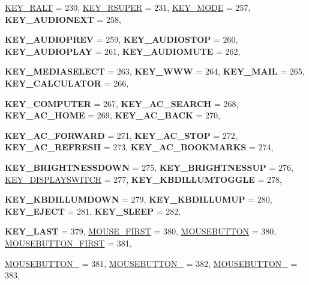 \begin{DoxyCompactItemize}
\par
\hyperlink{classphys_1_1MetaCode_a3e501cbb5bf0f6f1fdb7211465bda8d8aee151fcf77cce58411d19d9cb679875e}{KEY\_\-RALT} =  230, 
\hyperlink{classphys_1_1MetaCode_a3e501cbb5bf0f6f1fdb7211465bda8d8a84e2235ece031f83821867486ff52149}{KEY\_\-RSUPER} =  231, 
\hyperlink{classphys_1_1MetaCode_a3e501cbb5bf0f6f1fdb7211465bda8d8a9e26ea2006e876ccaa80fe4ae441da46}{KEY\_\-MODE} =  257, 
{\bfseries KEY\_\-AUDIONEXT} =  258, 
\par
{\bfseries KEY\_\-AUDIOPREV} =  259, 
{\bfseries KEY\_\-AUDIOSTOP} =  260, 
{\bfseries KEY\_\-AUDIOPLAY} =  261, 
{\bfseries KEY\_\-AUDIOMUTE} =  262, 
\par
{\bfseries KEY\_\-MEDIASELECT} =  263, 
{\bfseries KEY\_\-WWW} =  264, 
{\bfseries KEY\_\-MAIL} =  265, 
{\bfseries KEY\_\-CALCULATOR} =  266, 
\par
{\bfseries KEY\_\-COMPUTER} =  267, 
{\bfseries KEY\_\-AC\_\-SEARCH} =  268, 
{\bfseries KEY\_\-AC\_\-HOME} =  269, 
{\bfseries KEY\_\-AC\_\-BACK} =  270, 
\par
{\bfseries KEY\_\-AC\_\-FORWARD} =  271, 
{\bfseries KEY\_\-AC\_\-STOP} =  272, 
{\bfseries KEY\_\-AC\_\-REFRESH} =  273, 
{\bfseries KEY\_\-AC\_\-BOOKMARKS} =  274, 
\par
{\bfseries KEY\_\-BRIGHTNESSDOWN} =  275, 
{\bfseries KEY\_\-BRIGHTNESSUP} =  276, 
\hyperlink{classphys_1_1MetaCode_a3e501cbb5bf0f6f1fdb7211465bda8d8aadc4c974c86930fa73a693b7db4f7755}{KEY\_\-DISPLAYSWITCH} =  277, 
{\bfseries KEY\_\-KBDILLUMTOGGLE} =  278, 
\par
{\bfseries KEY\_\-KBDILLUMDOWN} =  279, 
{\bfseries KEY\_\-KBDILLUMUP} =  280, 
{\bfseries KEY\_\-EJECT} =  281, 
{\bfseries KEY\_\-SLEEP} =  282, 
\par
{\bfseries KEY\_\-LAST} =  379, 
\hyperlink{classphys_1_1MetaCode_a3e501cbb5bf0f6f1fdb7211465bda8d8a1bb7f008c7d430e886141a3b8b697129}{MOUSE\_\-FIRST} =  380, 
\hyperlink{classphys_1_1MetaCode_a3e501cbb5bf0f6f1fdb7211465bda8d8a9cc80a2db206fb540fbb92a8ff64268a}{MOUSEBUTTON} =  380, 
\hyperlink{classphys_1_1MetaCode_a3e501cbb5bf0f6f1fdb7211465bda8d8a92ee5571be5e198a62eda83f27b27ab8}{MOUSEBUTTON\_\-FIRST} =  381, 
\par
\hyperlink{classphys_1_1MetaCode_a3e501cbb5bf0f6f1fdb7211465bda8d8ab9dca2791ddf9838ec7ef94d03392279}{MOUSEBUTTON\_} =  381, 
\hyperlink{classphys_1_1MetaCode_a3e501cbb5bf0f6f1fdb7211465bda8d8a9b823314bfb9f39a069a909cf8075c48}{MOUSEBUTTON\_} =  382, 
\hyperlink{classphys_1_1MetaCode_a3e501cbb5bf0f6f1fdb7211465bda8d8a0ae247793a772d53d3dd6b4c84fef69d}{MOUSEBUTTON\_} =  383, 

\end{DoxyCompactItemize}

